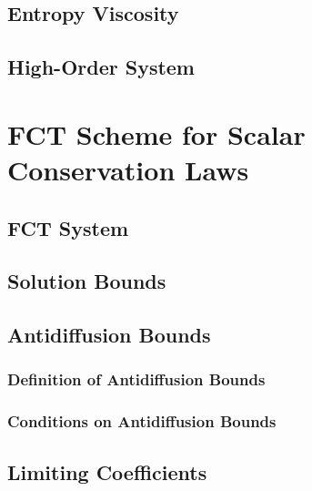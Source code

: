 \subsection{Entropy Viscosity\label{sec:entropy_viscosity_system}}
    
\subsection{High-Order System\label{sec:high_order_scheme_system}}
  
\section{FCT Scheme for Scalar Conservation Laws\label{sec:fct_scalar}}
\subsection{FCT System\label{sec:fct_scheme_scalar}}
  
\subsection{Solution Bounds\label{sec:fct_bounds}}
  
\subsection{Antidiffusion Bounds\label{sec:antidiffusion_bounds}}
  \subsubsection{Definition of Antidiffusion Bounds}
    
    
    
  \subsubsection{Conditions on Antidiffusion Bounds}
    
\subsection{Limiting Coefficients\label{sec:limiting_coefficients_scalar}}
  
